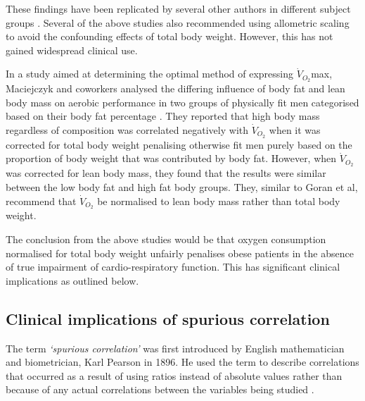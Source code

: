 These findings have been replicated by several other authors in different subject groups \parencite{loftin_scaling_2001,  lemaitre_maximum_2006,savonen_current_2012, krachler_cardiopulmonary_2014}. Several of the above studies also recommended using allometric scaling to avoid the confounding effects of total body weight. However, this has not gained widespread clinical use.

In a study aimed at determining the optimal method of expressing $\dot{V}_{O_2}$max, Maciejczyk and coworkers analysed the differing influence of body fat and lean body mass on aerobic performance in two groups of physically fit men categorised based on their body fat percentage \parencite{maciejczyk_influence_2014}. They reported that high body mass regardless of composition was correlated negatively with $\dot{V}_{O_2}$ when it was corrected for total body weight penalising otherwise fit men purely based on the proportion of body weight that was contributed by body fat. However, when $\dot{V}_{O_2}$ was corrected for lean body mass, they found that the results were similar between the low body fat and high fat body groups. They, similar to Goran et al\parencite{goran_total_2000}, recommend that $\dot{V}_{O_2}$ be normalised to lean body mass rather than total body weight.

The conclusion from the above studies would be that oxygen consumption normalised for total body weight unfairly penalises obese patients in the absence of true impairment of cardio-respiratory function. This has significant clinical implications as outlined below.

\subsection{Clinical implications of spurious correlation}

The term \textit{`spurious correlation'} was first introduced by English mathematician and biometrician, Karl Pearson in 1896. He used the term to describe correlations that occurred as a result of using ratios instead of absolute values rather than because of any actual correlations between the variables being studied \parencite{pearson_mathematical_1896}.

